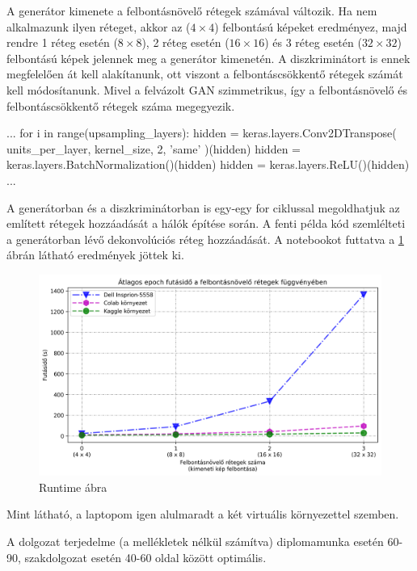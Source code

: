 A generátor kimenete a felbontásnövelő rétegek számával változik. Ha nem alkalmazunk ilyen réteget, akkor az ($4 \times 4$) felbontású képeket eredményez, majd rendre 1 réteg esetén ($8 \times 8$), 2 réteg esetén ($16 \times 16$) és 3 réteg esetén ($32 \times 32$) felbontású képek jelennek meg a generátor kimenetén. A diszkriminátort is ennek megfelelően át kell alakítanunk, ott viszont a felbontáscsökkentő rétegek számát kell módosítanunk. Mivel a felvázolt GAN szimmetrikus, így a felbontásnövelő és felbontáscsökkentő rétegek száma megegyezik.

\begin{python}
...
for i in range(upsampling_layers):
    hidden = keras.layers.Conv2DTranspose(
        units_per_layer, kernel_size, 2, 'same'
    )(hidden)
    hidden = keras.layers.BatchNormalization()(hidden)
    hidden = keras.layers.ReLU()(hidden)
...
\end{python}

A generátorban és a diszkriminátorban is egy-egy for ciklussal megoldhatjuk az említett rétegek hozzáadását a hálók építése során. A fenti példa kód szemlélteti a generátorban lévő dekonvolúciós réteg hozzáadását.
A notebookot futtatva a \ref{fig:runtime} ábrán látható eredmények jöttek ki.

\begin{figure}[h]
\centering
\includegraphics[width=15cm]{images/runtime.png}
\caption{Runtime ábra}
\label{fig:runtime}
\end{figure}

Mint látható, a laptopom igen alulmaradt a két virtuális környezettel szemben.


A dolgozat terjedelme (a mellékletek nélkül számítva) diplomamunka esetén 60-90, szakdolgozat esetén 40-60 oldal között optimális.

